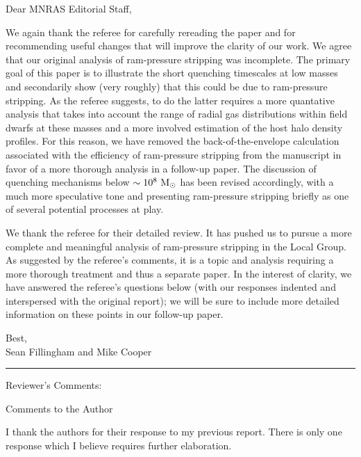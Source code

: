 \documentclass[11pt, preprint]{aastex}
\begin{document}
\pagestyle{empty}

\hspace*{0.5in} \vspace*{0.5in}

\noindent Dear MNRAS Editorial Staff, 

\noindent We again thank the referee for carefully rereading the paper and for recommending useful changes that will improve the clarity of our work. We agree that our original analysis of ram-pressure stripping was incomplete. The primary goal of this paper is to illustrate the short quenching timescales at low masses and secondarily show (very roughly) that this could be due to ram-pressure stripping. As the referee suggests, to do the latter requires a more quantative analysis that takes into account the range of radial gas distributions within field dwarfs at these masses and a more involved estimation of the host halo density profiles. For this reason, we have removed the back-of-the-envelope calculation associated with the efficiency of ram-pressure stripping from the manuscript in favor of a more thorough analysis in a follow-up paper. The discussion of quenching mechanisms below $\sim10^{8}~{\rm M}_{\odot}$ has been revised accordingly, with a much more speculative tone and presenting ram-pressure stripping briefly as one of several potential processes at play.  

\noindent We thank the referee for their detailed review. It has pushed us to pursue a more complete and meaningful analysis of ram-pressure stripping in the Local Group. As suggested by the referee's comments, it is a topic and analysis requiring a more thorough treatment and thus a separate paper. In the interest of clarity, we have answered the referee's questions below (with our responses indented and interspersed with the original report); we will be sure to include more detailed information on these points in our follow-up paper.

\noindent Best, \\
\noindent Sean Fillingham and Mike Cooper \\

\vspace*{0.3in}

\hrule

\noindent Reviewer's Comments: 

\noindent Comments to the Author

\noindent I thank the authors for their response to my previous report. There is only one response which I believe requires further elaboration.
\end{document}
